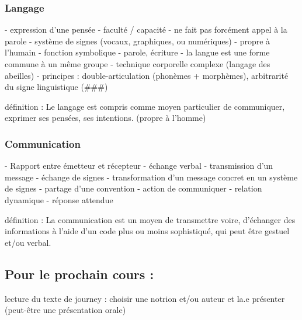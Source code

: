 \subsubsection{Langage}  
\begin{itemize}
   - expression d'une pensée 
   - faculté / capacité 
   - ne fait pas forcément appel à la parole
   - système de signes (vocaux, graphiques, ou numériques)
   - propre à l'humain
   - fonction symbolique
   - parole, écriture
   - la langue est une forme commune à un même groupe
   - technique corporelle complexe (langage des abeilles)
   - principes :
      double-articulation (phonèmes + morphèmes), arbitrarité du signe linguistique (###)
\end{itemize}

   définition :
   Le langage est compris comme moyen particulier de communiquer, exprimer ses pensées, ses intentions. (propre à l'homme)



\subsubsection{Communication}
\begin{itemize}
   - Rapport entre émetteur et récepteur
   - échange verbal
   - transmission d'un message
   - échange de signes
   - transformation d'un message concret en un système de signes
   - partage d'une convention 
   - action de communiquer
   - relation dynamique
   - réponse attendue
\end{itemize}

   définition :
   La communication est un moyen de transmettre voire, d'échanger des informations à l'aide d'un code plus ou moins sophistiqué, qui peut être gestuel et/ou verbal.

\subsection{Pour le prochain cours :}
lecture  du texte de journey :
choisir une notrion et/ou auteur et la.e présenter
(peut-être une présentation orale)
